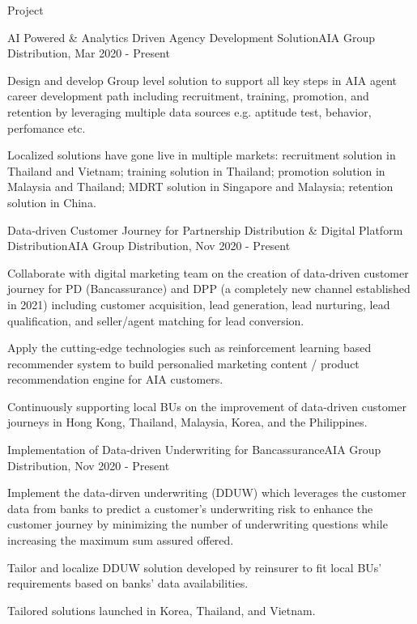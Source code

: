 \documentclass{resume} %
\begin{document}
\begin{rSection}{Project}


\begin{rSubsection}{AI Powered \& Analytics Driven Agency Development Solution}{}{AIA Group Distribution, Mar 2020 - Present}{}
\item Design and develop Group level solution to support all key steps in AIA agent career development path including recruitment, training, promotion, and retention by leveraging multiple data sources e.g. aptitude test, behavior, perfomance etc.
\item Localized solutions have gone live in multiple markets: recruitment solution in Thailand and Vietnam; training solution in Thailand; promotion solution in Malaysia and Thailand; MDRT solution in Singapore and Malaysia; retention solution in China.
\end{rSubsection}


\begin{rSubsection}{Data-driven Customer Journey for Partnership Distribution \& Digital Platform Distribution}{}{AIA Group Distribution, Nov 2020 - Present}{}
\item Collaborate with digital marketing team on the creation of data-driven customer journey for PD (Bancassurance) and DPP (a completely new channel established in 2021) including customer acquisition, lead generation, lead nurturing, lead qualification, and seller/agent matching for lead conversion.   
\item Apply the cutting-edge technologies such as reinforcement learning based recommender system to build personalied marketing content / product recommendation engine for AIA customers.
\item Continuously supporting local BUs on the improvement of data-driven customer journeys in Hong Kong, Thailand, Malaysia, Korea, and the Philippines. 
\end{rSubsection}


\begin{rSubsection}{Implementation of Data-driven Underwriting for Bancassurance}{}{AIA Group Distribution, Nov 2020 - Present}{}
\item Implement the data-dirven underwriting (DDUW) which leverages the customer data from banks to predict a customer's underwriting risk to enhance the customer journey by minimizing the number of underwriting questions while increasing the maximum sum assured offered.
\item Tailor and localize DDUW solution developed by reinsurer to fit local BUs' requirements based on banks' data availabilities.
\item Tailored solutions launched in Korea, Thailand, and Vietnam.
\end{rSubsection}


\end{rSection}
\end{document}
